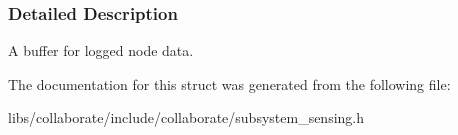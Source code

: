 \subsubsection{Detailed Description}
A buffer for logged node data. 

The documentation for this struct was generated from the following file\+:\begin{DoxyCompactItemize}
\item 
libs/collaborate/include/collaborate/subsystem\+\_\+sensing.\+h\end{DoxyCompactItemize}
